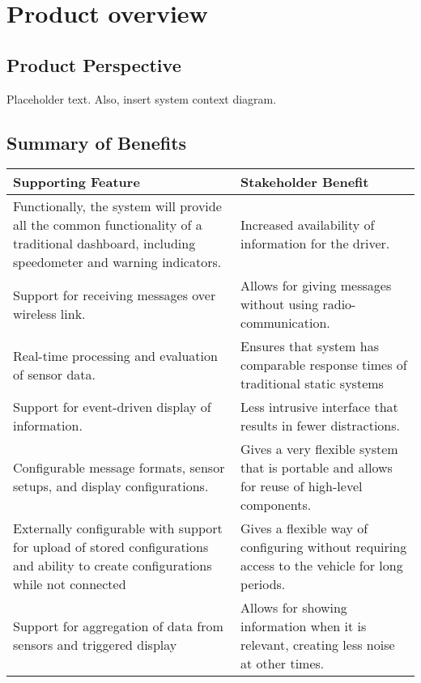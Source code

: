 
\section{Product overview}

\subsection{Product Perspective}

Placeholder text. 
Also, insert system context diagram.

\subsection{Summary of Benefits}

\begin{tabularx}{\textwidth}{|X|X|}
	\hline
	\rowcolor{gray!50}
	Supporting Feature & Stakeholder Benefit \\
	\hline
	Functionally, the system will provide all the common functionality of a
	traditional dashboard, including speedometer and warning indicators.
		&
		Increased availability of information for the driver. \\
	\hline
	Support for receiving messages over wireless link.
		&
		Allows for giving messages without using radio-communication. \\
	\hline
	Real-time processing and evaluation of sensor data.
		&
		Ensures that system has comparable response times of traditional static
		systems \\
	\hline
	Support for event-driven display of information.
		&
		Less intrusive interface that results in fewer distractions.\\
	\hline
	Configurable message formats, sensor setups, and display configurations.
		& 
		Gives a very flexible system that is portable and allows for reuse of
		high-level components.\\
	\hline
	Externally configurable with support for upload of stored configurations and
	ability to create configurations while not connected
		&
		Gives a flexible way of configuring without requiring access to the vehicle
		for long periods. \\
	\hline
	Support for aggregation of data from sensors and triggered display
		&
		Allows for showing information when it is relevant, creating less noise at
		other times. \\
	\hline
\end{tabularx}

